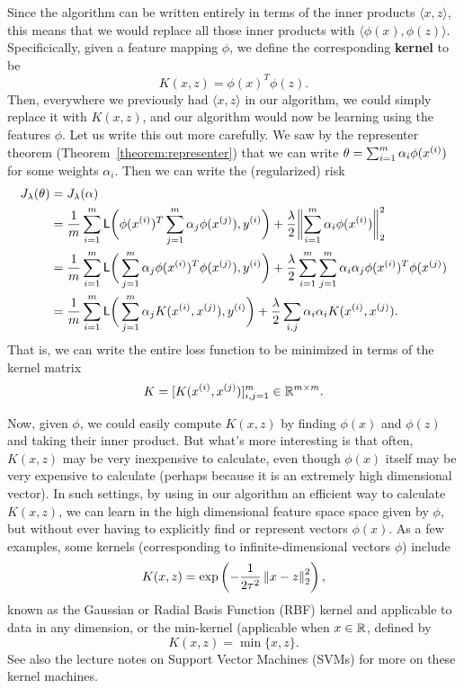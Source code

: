 \documentclass{article}
\newcommand{\loss}{\mathsf{L}}
\begin{document}
Since the algorithm can be written entirely in terms of the inner products
$\langle x, z \rangle$, this means that we would replace all those inner
products with $\langle \phi(x), \phi(z) \rangle$.  Specificically, given a
feature mapping $\phi$, we define the corresponding {\bf kernel} to be
\begin{equation*}
  K(x,z) = \phi(x)^T \phi(z).
\end{equation*}
Then, everywhere we previously had $\langle x, z \rangle$ in our algorithm,
we could simply replace it with $K(x,z)$, and our algorithm would now be
learning using the features $\phi$. Let us write this out more carefully.
We saw by the representer theorem (Theorem~\ref{theorem:representer})
that we can write $\theta = \sum_{i = 1}^m \alpha_i \phi({x^{(i)}})$ for
some weights $\alpha_i$. Then we can write the (regularized) risk
\begin{align*}
  J_\lambda(\theta)
  & = J_\lambda(\alpha) \\
  & = \frac{1}{m} \sum_{i = 1}^m \loss\bigg(\phi(\xsi)^T
  \sum_{j = 1}^m \alpha_j \phi(x^{(j)}), \ysi\bigg)
  + \frac{\lambda}{2}
  \ltwobigg{\sum_{i = 1}^m
    \alpha_i \phi(\xsi) }^2 \\
  & = \frac{1}{m} \sum_{i = 1}^m \loss\bigg(
  \sum_{j = 1}^m \alpha_j \phi(\xsi)^T \phi(x^{(j)}), \ysi\bigg)
  + \frac{\lambda}{2}
  \sum_{i = 1}^m
  \sum_{j = 1}^m
  \alpha_i \alpha_j \phi(\xsi)^T \phi(x^{(j)}) \\
  & = \frac{1}{m} \sum_{i = 1}^m \loss\bigg(
  \sum_{j = 1}^m \alpha_j K(\xsi, x^{(j)}), \ysi\bigg)
  + \frac{\lambda}{2} \sum_{i, j} \alpha_i \alpha_i K(\xsi, x^{(j)}).
\end{align*}
That is, we can write the entire loss function to be minimized
in terms of the kernel matrix
\begin{equation*}
  K = [K({x^{(i)}}, x^{(j)})]_{i, j = 1}^m \in \mathbb{R}^{m \times m}.
\end{equation*}

Now, given $\phi$, we could easily compute $K(x,z)$ by finding $\phi(x)$ and
$\phi(z)$ and taking their inner product.  But what's more interesting is
that often, $K(x,z)$ may be very inexpensive to calculate, even though
$\phi(x)$ itself may be very expensive to calculate (perhaps because it is
an extremely high dimensional vector).  In such settings, by using in our
algorithm an efficient way to calculate $K(x,z)$, we can learn in the high
dimensional feature space space given by $\phi$, but without ever having to
explicitly find or represent vectors $\phi(x)$.
As a few examples, some kernels (corresponding to infinite-dimensional
vectors $\phi$) include
\begin{equation*}
  K(x, z) = \exp\left(-\frac{1}{2 \tau^2} \left\|{x - z}\right\|_2^2\right),
\end{equation*}
known as the Gaussian or Radial Basis Function (RBF) kernel and applicable
to data in any dimension, or the min-kernel (applicable when
$x \in \mathbb{R}$, defined by
\begin{equation*}
  K(x, z) = \min\{x, z\}.
\end{equation*}
See also the lecture notes on Support Vector Machines (SVMs) for
more on these kernel machines.
\end{document}
